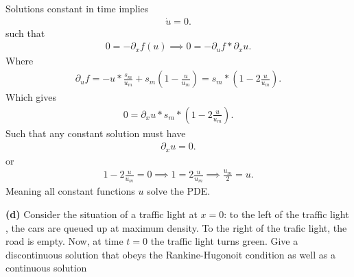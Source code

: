 \begin{solution}
  Solutions constant in time implies 
  \begin{align*}
    \dot{u}  = 0
  .\end{align*}
  such that 
  \begin{align*}
    0 = -\partial_x f(u) \implies 0 = - \partial_u f*\partial_x u
  .\end{align*}
  Where 
  \begin{align*}
    \partial_u f =  -u*\frac{s_m}{u_m} + s_m(1-\frac{u}{u_m}) = s_m*(1-2\frac{u}{u_m} )
  .\end{align*}
  Which gives 
  \begin{align*}
    0 = \partial_xu*s_m*(1-2\frac{u}{u_m})
  .\end{align*}
  Such that any constant solution must have 
  \begin{align*}
    \partial_xu = 0
  .\end{align*}
  or 
  \begin{align*}
    1-2 \frac{u}{u_m}  = 0  \implies   1 = 2 \frac{u}{u_m} \implies \frac{u_m}{2} = u
  .\end{align*}
  Meaning all constant functions $u$ solve the PDE.
\end{solution}
\begin{question}
  \textbf{(d)}  Consider the situation of a traffic light at $x=0$: to the left of the traffic light , the cars 
  are queued up at maximum density. To the right of the trafic light, the road is empty. Now, at time $t=0$ the traffic light turns green.
  Give a discontinuous solution that obeys the Rankine-Hugonoit condition as well as a continuous solution
\end{question}
